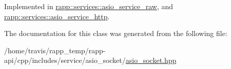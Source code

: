 Implemented in \hyperlink{classrapp_1_1services_1_1asio__service__raw_a11078ec812461792f81bca299db468ce}{rapp\-::services\-::asio\-\_\-service\-\_\-raw}, and \hyperlink{classrapp_1_1services_1_1asio__service__http_ad95e973eef8650c5bbc8b90a95feac76}{rapp\-::services\-::asio\-\_\-service\-\_\-http}.



The documentation for this class was generated from the following file\-:\begin{DoxyCompactItemize}
\item 
/home/travis/rapp\-\_\-temp/rapp-\/api/cpp/includes/service/asio\-\_\-socket/\hyperlink{asio__socket_8hpp}{asio\-\_\-socket.\-hpp}\end{DoxyCompactItemize}

